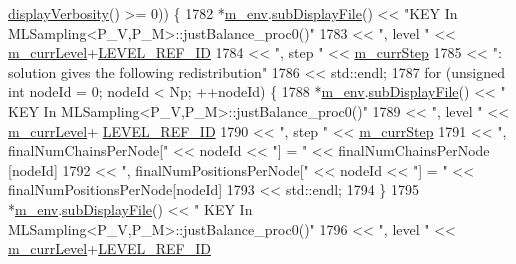 \begin{DoxyCode}
      \hyperlink{class_q_u_e_s_o_1_1_base_environment_a1fe5f244fc0316a0ab3e37463f108b96}{displayVerbosity}() >= 0)) \{
1782     *\hyperlink{class_q_u_e_s_o_1_1_m_l_sampling_a13f1ca4fe9f94822fe572a743eaced1d}{m\_env}.\hyperlink{class_q_u_e_s_o_1_1_base_environment_a8a0064746ae8dddfece4229b9ad374d6}{subDisplayFile}() << \textcolor{stringliteral}{"KEY In MLSampling<P\_V,P\_M>::justBalance\_proc0()"}
1783                             << \textcolor{stringliteral}{", level "} << \hyperlink{class_q_u_e_s_o_1_1_m_l_sampling_af9416874c856e50f3b35270e801f17e4}{m\_currLevel}+\hyperlink{_m_l_sampling_level_options_8h_a68d15eaf394d210effcf584b938206d3}{LEVEL\_REF\_ID}
1784                             << \textcolor{stringliteral}{", step "}  << \hyperlink{class_q_u_e_s_o_1_1_m_l_sampling_a1b1f8ccb4823bdfa26ec652f0807c63e}{m\_currStep}
1785                             << \textcolor{stringliteral}{": solution gives the following redistribution"}
1786                             << std::endl;
1787     \textcolor{keywordflow}{for} (\textcolor{keywordtype}{unsigned} \textcolor{keywordtype}{int} nodeId = 0; nodeId < Np; ++nodeId) \{
1788       *\hyperlink{class_q_u_e_s_o_1_1_m_l_sampling_a13f1ca4fe9f94822fe572a743eaced1d}{m\_env}.\hyperlink{class_q_u_e_s_o_1_1_base_environment_a8a0064746ae8dddfece4229b9ad374d6}{subDisplayFile}() << \textcolor{stringliteral}{"  KEY In MLSampling<P\_V,P\_M>::justBalance\_proc0()"}
1789                               << \textcolor{stringliteral}{", level "} << \hyperlink{class_q_u_e_s_o_1_1_m_l_sampling_af9416874c856e50f3b35270e801f17e4}{m\_currLevel}+
      \hyperlink{_m_l_sampling_level_options_8h_a68d15eaf394d210effcf584b938206d3}{LEVEL\_REF\_ID}
1790                               << \textcolor{stringliteral}{", step "}  << \hyperlink{class_q_u_e_s_o_1_1_m_l_sampling_a1b1f8ccb4823bdfa26ec652f0807c63e}{m\_currStep}
1791                               << \textcolor{stringliteral}{", finalNumChainsPerNode["}    << nodeId << \textcolor{stringliteral}{"] = "} << finalNumChainsPerNode
      [nodeId]
1792                               << \textcolor{stringliteral}{", finalNumPositionsPerNode["} << nodeId << \textcolor{stringliteral}{"] = "} << 
      finalNumPositionsPerNode[nodeId]
1793                               << std::endl;
1794     \}
1795     *\hyperlink{class_q_u_e_s_o_1_1_m_l_sampling_a13f1ca4fe9f94822fe572a743eaced1d}{m\_env}.\hyperlink{class_q_u_e_s_o_1_1_base_environment_a8a0064746ae8dddfece4229b9ad374d6}{subDisplayFile}() << \textcolor{stringliteral}{"  KEY In MLSampling<P\_V,P\_M>::justBalance\_proc0()"}
1796                             << \textcolor{stringliteral}{", level "} << \hyperlink{class_q_u_e_s_o_1_1_m_l_sampling_af9416874c856e50f3b35270e801f17e4}{m\_currLevel}+\hyperlink{_m_l_sampling_level_options_8h_a68d15eaf394d210effcf584b938206d3}{LEVEL\_REF\_ID}

\end{DoxyCode}
